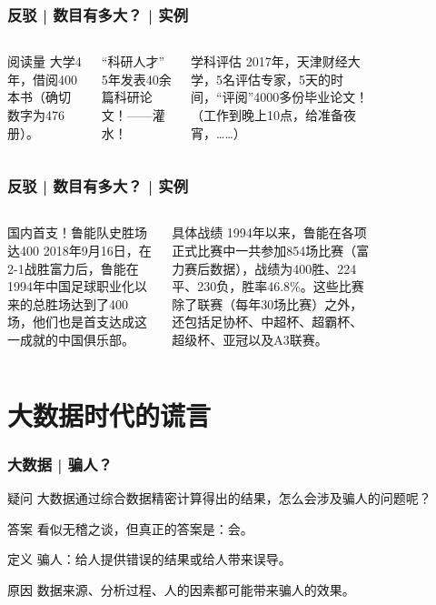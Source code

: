 \begin{frame}
  \frametitle{反驳 | 数目有多大？ | 实例}
  \begin{columns}
  \begin{block}{阅读量}
    大学4年，借阅400本书（确切数字为476册）。
  \end{block}
  \pause
  \pause
  \begin{block}{“科研人才”}
    5年发表40余篇科研论文！——灌水！
  \end{block}
  \pause
  \begin{block}{学科评估}
    2017年，天津财经大学，5名评估专家，5天的时间，“评阅”4000多份毕业论文！（工作到晚上10点，给准备夜宵，……）
  \end{block}
    \begin{figure}
      \centering
    \end{figure}
  \end{columns}
\end{frame}

\begin{frame}
  \frametitle{反驳 | 数目有多大？ | 实例}
  \begin{columns}
  \begin{block}{国内首支！鲁能队史胜场达400}
    2018年9月16日，在2-1战胜富力后，鲁能在1994年中国足球职业化以来的总胜场达到了400场，他们也是首支达成这一成就的中国俱乐部。
  \end{block}
  \pause
  \begin{block}{具体战绩}
    1994年以来，鲁能在各项正式比赛中一共参加854场比赛（富力赛后数据），战绩为400胜、224平、230负，胜率46.8\%。这些比赛除了联赛（每年30场比赛）之外，还包括足协杯、中超杯、超霸杯、超级杯、亚冠以及A3联赛。
  \end{block}
    \begin{figure}
      \centering
    \end{figure}
  \end{columns}
\end{frame}

\section{大数据时代的谎言}
\begin{frame}
  \frametitle{大数据 | 骗人？}
  \begin{block}{疑问}
    大数据通过综合数据精密计算得出的结果，怎么会涉及骗人的问题呢？
  \end{block}
  \pause
  \begin{block}{答案}
    看似无稽之谈，但真正的答案是：\alert{会}。
  \end{block}
  \pause
  \begin{block}{定义}
    骗人：给人提供错误的结果或给人带来误导。
  \end{block}
  \pause
  \begin{block}{原因}
    数据来源、分析过程、人的因素都可能带来骗人的效果。
  \end{block}
\end{frame}

